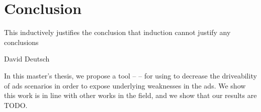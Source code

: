 \chapter{Conclusion}\label{sec:conclusion}

\epigraph{This inductively justifies the conclusion that induction cannot justify any conclusions}{David Deutsch}

In this master's thesis, we propose a tool -- \hefe -- for using  to decrease the
driveability of \acrfull{ads} scenarios in order to expose underlying weaknesses in the
\acrshort{ads}. We show this work is in line with other works in the field, and we show that our
results are TODO.
